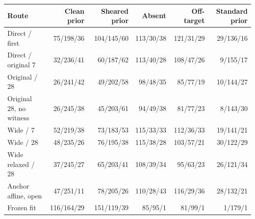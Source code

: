 \begin{tabular}{@{}lrrrrr@{}}
\toprule
Route & Clean prior & Sheared prior & Absent & Off-target & Standard prior \\
\midrule
Direct / first & 75/198/36 & 104/145/60 & 113/30/38 & 121/31/29 & 29/136/16 \\
Direct / original 7 & 32/236/41 & 60/187/62 & 113/40/28 & 108/47/26 & 9/155/17 \\
Original / 28 & 26/241/42 & 49/202/58 & 98/48/35 & 85/77/19 & 10/144/27 \\
Original 28, no witness & 26/245/38 & 45/203/61 & 94/49/38 & 81/77/23 & 8/143/30 \\
Wide / 7 & 52/219/38 & 73/183/53 & 115/33/33 & 112/36/33 & 19/141/21 \\
Wide / 28 & 48/235/26 & 76/195/38 & 115/38/28 & 103/57/21 & 30/122/29 \\
Wide relaxed / 28 & 37/245/27 & 65/203/41 & 108/39/34 & 95/63/23 & 26/121/34 \\
Anchor affine, open & 47/251/11 & 78/205/26 & 110/28/43 & 116/29/36 & 28/132/21 \\
Frozen fit & 116/164/29 & 151/119/39 & 85/95/1 & 81/99/1 & 1/179/1 \\
\bottomrule
\end{tabular}

